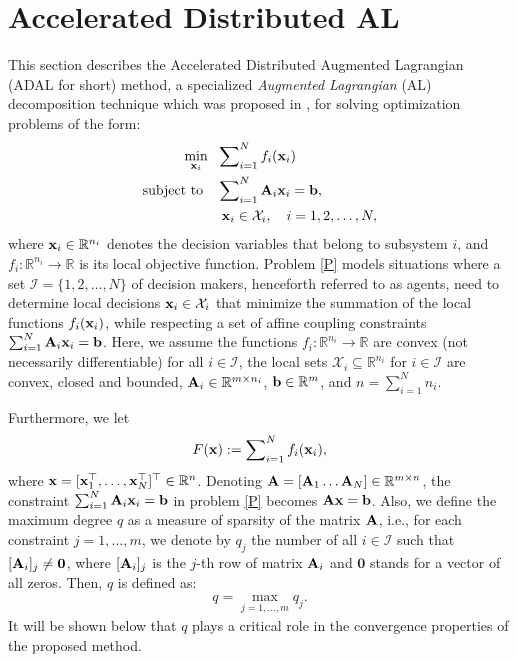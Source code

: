 \documentclass[doublecolumn]{IEEEtran}
\def\0b{\mathbf{0}}
\begin{document}
\section{Accelerated Distributed AL\label{sec_alg}}
This section describes the Accelerated Distributed Augmented Lagrangian (ADAL for short)
method, a specialized \emph{Augmented Lagrangian} (AL) decomposition technique which was proposed in \cite{Nikos_math_prog},
for solving optimization problems of the form:
\begin{align}\label{P}
\min_{{ {\bf x} }_i}  ~& ~ \sum\nolimits_{i=1}^N f_i({ {\bf x} }_i) \notag\\
\text{subject to } ~&~ \sum\nolimits_{i=1}^N { {\bf A} }_i { {\bf x} }_i = { {\bf b} }, \\
 &~~ { {\bf x} }_i \in \mathcal{X}_i,\quad i=1,2,\dots,N,\notag
\end{align}
where ${ {\bf x} }_i \in \mathbb{R}^{n_i}$ denotes the decision variables that belong to subsystem $i$,
and $f_i:\mathbb{R}^{n_i} \to \mathbb{R}$ is its local objective function.
Problem \eqref{P} models situations where a set $\mathcal{I}=\{ 1,2,\dots,N\}$ of decision makers, henceforth referred to as agents, need to determine local decisions ${ {\bf x} }_i\in\mathcal{X}_i$ that minimize the summation of the local functions $f_i({ {\bf x} }_i)$, while respecting a set of affine coupling constraints $\sum_{i=1}^N { {\bf A} }_i { {\bf x} }_i = { {\bf b} }$.
Here, we assume the functions $f_i: \mathbb{R}^{n_i}\rightarrow \mathbb R$ are convex (not necessarily differentiable)
for all $i\in\mathcal{I}$, the local sets $\mathcal{X}_{i}\subseteq {\mathbb R}^{n_i}$ for $i\in\mathcal{I}$ are convex, closed and bounded, ${ {\bf A} }_i \in \mathbb{R}^{m\times n_i}$, ${ {\bf b} } \in \mathbb{R}^m$, and $n=\sum_{i=1}^N n_i$.

Furthermore, we let
\[
F({ {\bf x} }) :=  \sum\nolimits_{i=1}^{N} f_i({ {\bf x} }_i),
\]
where $\mathbf{x} = [ { {\bf x} }_1^\top,\dots, { {\bf x} }_N^\top]^\top \in \mathbb{R}^n$. Denoting ${ {\bf A} } = [ { {\bf A} }_1 \dots { {\bf A} }_N ] \in{\mathbb R}^{m\times n}$,  the constraint $\sum_{i=1}^{N} { {\bf A} }_i { {\bf x} }_i = { {\bf b} }$ in problem \eqref{P} becomes ${ {\bf A} } { {\bf x} } = { {\bf b} }$.
Also, we define the maximum degree $q$ as a measure of sparsity of the matrix ${ {\bf A} }$, i.e.,
for each constraint $j = 1, \ldots, m$, we denote by $q_j$ the number of all $i \in { \mathcal{I} }$ such that $[{ {\bf A} }_i]_j \neq \0b$, where $[{ {\bf A} }_i]_j$ is the $j$-th row of matrix ${ {\bf A} }_i$ and $\0b$ stands for a vector of all zeros.
Then, $q$ is defined as:
\begin{align}\label{eqn:q}
q = \max_{j = 1,\ldots,m} q_j.
\end{align}
It will be shown below that $q$ plays a critical role in the convergence properties of the
proposed method.
\end{document}

